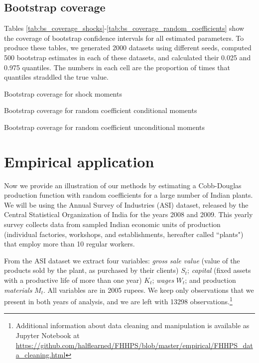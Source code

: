\subsection{Bootstrap coverage}

Tables \ref{tab:bs_coverage_shocks}-\ref{tab:bs_coverage_random_coefficients} show the coverage of bootstrap confidence intervals for all estimated parameters. To produce these tables, we generated 2000 datasets using different seeds, computed 500 bootstrap estimates in each of these datasets, and calculated their 0.025 and 0.975 quantiles. The numbers in each cell are the proportion of times that quantiles straddled the true value.

\begin{table}[H]
  \singlespacing
  \caption{Bootstrap coverage for shock moments}
  
  \label{tab:bs_coverage_shocks}
\end{table}

\begin{table}[H]
  \singlespacing
  \caption{Bootstrap coverage for random coefficient conditional moments}
  
  \label{tab:bs_conditional_coverage}
\end{table}

\begin{table}[H]
  \singlespacing
  \caption{Bootstrap coverage for random coefficient unconditional moments}
  
  \label{tab:bs_coverage_random_coefficients}
\end{table}

\section{Empirical application}

Now we provide an illustration of our methods by estimating a Cobb-Douglas production function with random coefficients for a large number of Indian plants. We will be using the Annual Survey of Industries (ASI) dataset, released by the Central Statistical Organization of India for the years 2008 and 2009. This yearly survey collects data from sampled Indian economic units of production (individual factories, workshops, and establishments, hereafter called ``plants") that employ more than 10 regular workers. 

From the ASI dataset we extract four variables: \emph{gross sale value} (value of the products sold by the plant, as purchased by their clients) $S_{t}$; \emph{capital} (fixed assets with a productive life of more than one year) $K_{t}$; \emph{wages} $W_{t}$; and production \emph{materials} $M_{t}$. All variables are in 2005 rupees. We keep only observations that we present in both years of analysis, and we are left with 13298 observations.\footnote{Additional information about data cleaning and manipulation is available as Jupyter Notebook at \url{https://github.com/halflearned/FHHPS/blob/master/empirical/FHHPS_data_cleaning.html}}


